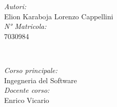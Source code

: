 \begin{titlepage}
\begin{minipage}{0.4\textwidth}
\begin{flushleft} \large
\emph{Autori:}\\
Elion Karaboja \newline Lorenzo Cappellini
\\[1.2em]
\emph{N° Matricola:}\\
7030984 \\[1.2em]
\end{flushleft}
\end{minipage}
~
\begin{minipage}{0.4\textwidth}
\begin{flushright} \large
\emph{Corso principale:} \\
Ingegneria del Software  \\[1.2em]
\emph{Docente corso:} \\
Enrico Vicario
\end{flushright}
\end{minipage}\\[2cm]
\makeatother


\vfill %

\end{titlepage}